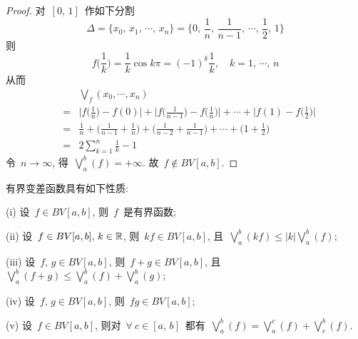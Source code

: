 \begin{proof}
对~$[0,\,1]$~作如下分割
\[
\Delta = \{x_0,\,x_1,\,\cdots,\,x_n\} = \Big\{0,\,\frac{1}{n},\,\frac{1}{n-1},\,\cdots,\,\frac{1}{2},\,1 \Big\}
\]
则
\[
f\big( \frac{1}{k} \big) = \frac{1}{k} \cos k \pi = (-1)^k \frac{1}{k}, \quad k=1,\,\cdots,\,n
\]
从而
\begin{eqnarray*}
&&\textstyle{\bigvee}_f(x_0,\cdots,x_n) \\
&=& \Big| f\big( \frac{1}{n} \big)-f(0) \Big| + \Big| f\big( \frac{1}{n-1} \big) - f\big( \frac{1}{n} \big) \Big| + \cdots + \Big| f(1) - f\big( \frac{1}{2} \big)\Big| \\
&=& \frac{1}{n} + \Big( \frac{1}{n-1} + \frac{1}{n} \Big) + \Big( \frac{1}{n-2} + \frac{1}{n-1} \Big) + \cdots + \Big(1 + \frac{1}{2} \Big) \\
&=& 2 \sum_{k=1}^n \frac{1}{k} -1
\end{eqnarray*}
令~$n \to \infty$, 得~$\bigvee\limits_a^b(f) = +\infty$. 故~$f \notin BV[a,b]$.
\end{proof}

\begin{proposition} \label{prop521}
有界变差函数具有如下性质:

(i) 设~$f \in BV[a,b]$, 则~$f$~是有界函数;

(ii) 设~$f \in BV[a,b], \, k \in \mathbb{R}$, 则~$kf \in BV[a,b]$, 且~$\bigvee\limits_a^b(kf) \leqslant |k| \bigvee\limits_a^b(f)$;

(iii) 设~$f,\,g \in BV[a,b]$, 则~$f+g \in BV[a,b]$, 且~$\bigvee\limits_a^b(f+g) \leqslant \bigvee\limits_a^b(f) + \bigvee\limits_a^b(g)$;

(iv) 设~$f,\,g \in BV[a,b]$, 则~$fg \in BV[a,b]$;

(v) 设~$f \in BV[a,b]$, 则对~$\forall~c \in [a,\,b]$~都有~$\bigvee\limits_a^b(f) = \bigvee\limits_a^c(f) + \bigvee\limits_c^b(f)$.
\end{proposition}

